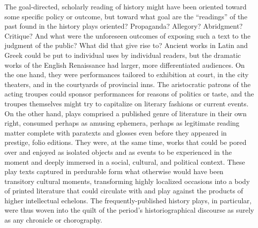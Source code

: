 The goal-directed, scholarly reading of history might have been oriented toward some specific policy or outcome, but toward what goal are the ``readings'' of the past found in the history plays oriented? Propaganda? Allegory? Abridgment? Critique? And what were the unforeseen outcomes of exposing such a text to the judgment of the public? What did that give rise to? Ancient works in Latin and Greek could be put to individual uses by individual readers, but the dramatic works of the English Renaissance had larger, more differentiated audiences. On the one hand, they were performances tailored to exhibition at court, in the city theaters, and in the courtyards of provincial inns. The aristocratic patrons of the acting troupes could sponsor performances for reasons of politics or taste, and the troupes themselves might try to capitalize on literary fashions or current events. On the other hand, plays comprised a published genre of literature in their own right, consumed perhaps as amusing ephemera, perhaps as legitimate reading matter complete with paratexts and glosses even before they appeared in prestige, folio editions. They were, at the same time, works that could be pored over and enjoyed as isolated objects and as events to be experienced in the moment and deeply immersed in a social, cultural, and political context. These play texts captured in perdurable form what otherwise would have been transitory cultural moments, transforming highly localized occasions into a body of printed literature that could circulate with and play against the products of higher intellectual echelons.  The frequently-published history plays, in particular, were thus woven into the quilt of the period's historiographical discourse as surely as any chronicle or chorography.

